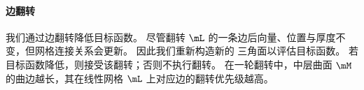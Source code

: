 
\paragraph{边翻转}
我们通过边翻转降低目标函数。 %
%
尽管翻转 $\mL$ 的一条边后向量、位置与厚度不变，但网格连接关系会更新。
因此我们重新构造新的 \Bezier 三角面以评估目标函数。
若目标函数降低，则接受该翻转；否则不执行翻转。
在一轮翻转中，中层曲面 $\mM$ 的曲边越长，其在线性网格 $\mL$ 上对应边的翻转优先级越高。


%


